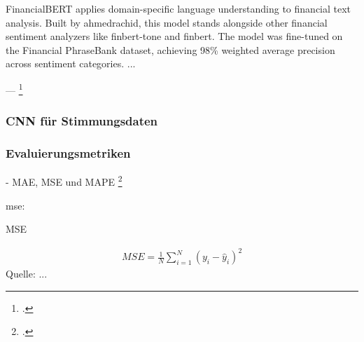 FinancialBERT applies domain-specific language understanding to financial text analysis. Built by ahmedrachid, this model stands alongside other financial sentiment analyzers like finbert-tone and finbert. The model was fine-tuned on the Financial PhraseBank dataset, achieving 98\% weighted average precision across sentiment categories.
...

---
\footcite{hazourli2022financialbert}


\subsubsection{CNN für Stimmungsdaten}\label{sec:theorie_cnn}

\subsubsection{Evaluierungsmetriken}\label{sec:theorie_evalmetrics}

- \ac{MAE}, \ac{MSE} und \ac{MAPE}  
\footcite[Kap. 4.3]{xie2024deep}

mse:

\begin{formel}[h]
	\caption{\ac{MSE}}
	\label{frm:mse}
	\begin{align}
		MSE = \frac{1}{N} \sum_{i=1}^{N} (y_i - \hat{y}_i)^2
	\end{align}
	\vspace{0.5em}
	\normalsize{Quelle: ...}
	\vspace{-1.0em}
\end{formel}







